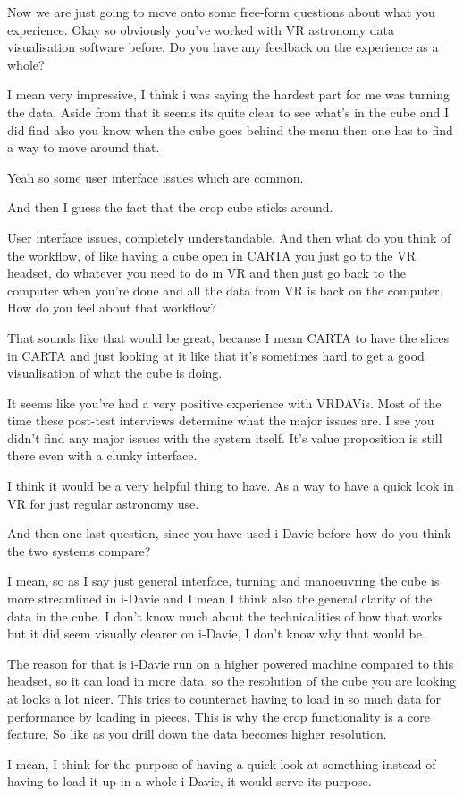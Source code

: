 \begin{description}
    \mich Now we are just going to move onto some free-form questions about what you experience. Okay so obviously you've worked with VR astronomy data visualisation software before. Do you have any feedback on the experience as a whole?
    
    \omri I mean very impressive, I think i was saying the hardest part for me was turning the data. Aside from that it seems its quite clear to see what's in the cube and I did find also you know when the cube goes behind the menu then one has to find a way to move around that.
    
    \mich Yeah so some user interface issues which are common.
    
    \omri And then I guess the fact that the crop cube sticks around.
    
    \mich User interface issues, completely understandable. And then what do you think of the workflow, of like having a cube open in CARTA you just go to the VR headset, do whatever you need to do in VR and then just go back to the computer when you're done and all the data from VR is back on the computer. How do you feel about that workflow?
    
    \omri That sounds like that would be great, because I mean CARTA to have the slices in CARTA and just looking at it like that it's sometimes hard to get a good visualisation of what the cube is doing.
    
    \mich It seems like you've had a very positive experience with VRDAVis. Most of the time these post-test interviews determine what the major issues are. I see you didn't find any major issues with the system itself. It's value proposition is still there even with a clunky interface.
    
    \omri I think it would be a very helpful thing to have. As a way to have a quick look in VR for just regular astronomy use.
    
    \mich And then one last question, since you have used i-Davie before how do you think the two systems compare?
    
    \omri I mean, so as I say just general interface, turning and manoeuvring the cube is more streamlined in i-Davie and I mean I think also the general clarity of the data in the cube. I don't know much about the technicalities of how that works but it did seem visually clearer on i-Davie, I don't know why that would be.
    
    \mich The reason for that is i-Davie run on a higher powered machine compared to this headset, so it can load in more data, so the resolution of the cube you are looking at looks a lot nicer. This tries to counteract having to load in so much data for performance by loading in pieces. This is why the crop functionality is a core feature. So like as you drill down the data becomes higher resolution.
    
    \omri I mean, I think for the purpose of having a quick look at something instead of having to load it up in a whole i-Davie, it would serve its purpose.
\end{description}